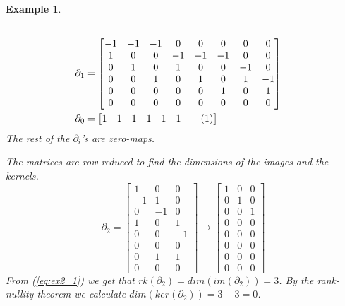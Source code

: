 \documentclass[11pt,a4paper,twoside]{report}
\newtheorem{myex}[mythm]{Example}
\newcommand\numberthis{\addtocounter{equation}{1}\tag{\theequation}}
\begin{document}
\begin{myex}
\begin{align*}
\\
\partial_1&=
\begin{bmatrix}
-1 & -1 & -1 & 0 & 0 & 0 & 0 & 0 \\
1 & 0 & 0 & -1 & -1 & -1 & 0 & 0 \\
0 & 1 & 0 & 1 & 0 & 0 & -1 & 0 \\
0 & 0 & 1 & 0 & 1 & 0 & 1 & -1 \\
0 & 0 & 0 & 0 & 0 & 1 & 0 & 1 \\
0 & 0 & 0 & 0 & 0 & 0 & 0 & 0 
\end{bmatrix}
\\
\partial_0&=
\begin{bmatrix}
1 & 1 & 1 & 1 & 1 & 1 \numberthis \label{eq:ex2_0}
\end{bmatrix}
\end{align*} 
The rest of the $\partial_i$'s are zero-maps.

The matrices are row reduced to find the dimensions of the images and the kernels.
\begin{equation}\label{eq:ex2_1}
\partial_2=
\begin{bmatrix}
1 & 0 & 0 \\
-1 & 1 & 0 \\
0 & -1 & 0 \\
1 & 0 & 1 \\
0 & 0 & -1 \\
0 & 0 & 0 \\
0 & 1 & 1 \\
0 & 0 & 0 
\end{bmatrix}
\to
\begin{bmatrix}
1 & 0 & 0 \\
0 & 1 & 0 \\
0 & 0 & 1 \\
0 & 0 & 0 \\
0 & 0 & 0 \\
0 & 0 & 0 \\
0 & 0 & 0 \\
0 & 0 & 0 
\end{bmatrix}
\end{equation}
From (\ref{eq:ex2_1}) we get that $rk(\partial_2)=dim(im(\partial_2))=3$. By the rank-nullity theorem we calculate $dim(ker(\partial_2))=3-3=0$.


\end{myex}
\end{document}

